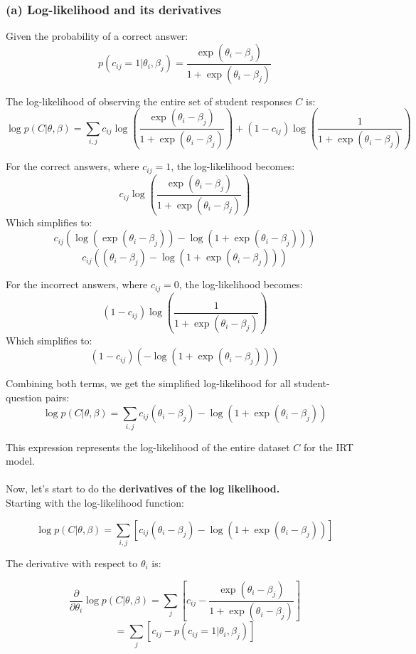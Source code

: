 \documentclass{article}
\begin{document}
\subsubsection*{(a) Log-likelihood and its derivatives}
Given the probability of a correct answer:
\[ p(c_{ij} = 1|\theta_i, \beta_j) = \frac{\exp(\theta_i - \beta_j)}{1 + \exp(\theta_i - \beta_j)} \]

The log-likelihood of observing the entire set of student responses \( C \) is:
\[ \log p(C|\theta, \beta) = \sum_{i,j} c_{ij} \log \left( \frac{\exp(\theta_i - \beta_j)}{1+\exp(\theta_i - \beta_j)} \right) + (1 - c_{ij}) \log \left( \frac{1}{1+\exp(\theta_i - \beta_j)} \right) \]

For the correct answers, where \( c_{ij} = 1 \), the log-likelihood becomes:
\[ c_{ij} \log \left( \frac{\exp(\theta_i - \beta_j)}{1+\exp(\theta_i - \beta_j)} \right) \]
Which simplifies to:
\[ c_{ij} (\log(\exp(\theta_i - \beta_j)) - \log(1 + \exp(\theta_i - \beta_j))) \]
\[ c_{ij} ((\theta_i - \beta_j) - \log(1 + \exp(\theta_i - \beta_j))) \]

For the incorrect answers, where \( c_{ij} = 0 \), the log-likelihood becomes:
\[ (1 - c_{ij}) \log \left( \frac{1}{1+\exp(\theta_i - \beta_j)} \right) \]
Which simplifies to:
\[ (1 - c_{ij}) (-\log(1 + \exp(\theta_i - \beta_j))) \]

Combining both terms, we get the simplified log-likelihood for all student-question pairs:
\[ \log p(C|\theta, \beta) = \sum_{i,j} c_{ij} (\theta_i - \beta_j) - \log(1 + \exp(\theta_i - \beta_j)) \]

This expression represents the log-likelihood of the entire dataset \( C \) for the IRT model.
\\
\\

Now, let's start to do the \textbf{derivatives of the log likelihood.}\\

Starting with the log-likelihood function:

\[ \log p(C|\theta, \beta) = \sum_{i,j} \left[ c_{ij} (\theta_i - \beta_j) - \log(1 + \exp(\theta_i - \beta_j)) \right] \]

The derivative with respect to \( \theta_i \) is:

\[ \frac{\partial}{\partial \theta_i} \log p(C|\theta, \beta) = \sum_{j} \left[ c_{ij} - \frac{\exp(\theta_i - \beta_j)}{1 + \exp(\theta_i - \beta_j)} \right] \]
\[ = \sum_{j} \left[ c_{ij} - p(c_{ij} = 1|\theta_i, \beta_j) \right] \]
\end{document}
